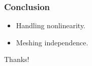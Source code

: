 \documentclass[serif,mathserif]{beamer}
\begin{document}
\begin{frame}
  \frametitle{Conclusion}
  \begin{itemize}
   \item Handling nonlinearity.
   \item Meshing independence.
  \end{itemize}
\end{frame}

\begin{frame} 
  \begin{center}
    \Huge{Thanks!}
  \end{center}
\end{frame}
\end{document}
